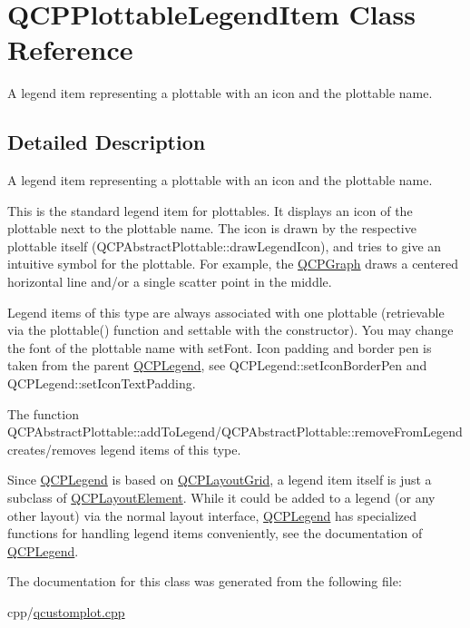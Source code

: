 \hypertarget{class_q_c_p_plottable_legend_item}{}\section{Q\+C\+P\+Plottable\+Legend\+Item Class Reference}
\label{class_q_c_p_plottable_legend_item}


A legend item representing a plottable with an icon and the plottable name.  




\subsection{Detailed Description}
A legend item representing a plottable with an icon and the plottable name. 

This is the standard legend item for plottables. It displays an icon of the plottable next to the plottable name. The icon is drawn by the respective plottable itself (Q\+C\+P\+Abstract\+Plottable\+::draw\+Legend\+Icon), and tries to give an intuitive symbol for the plottable. For example, the \mbox{\hyperlink{class_q_c_p_graph}{Q\+C\+P\+Graph}} draws a centered horizontal line and/or a single scatter point in the middle.

Legend items of this type are always associated with one plottable (retrievable via the plottable() function and settable with the constructor). You may change the font of the plottable name with set\+Font. Icon padding and border pen is taken from the parent \mbox{\hyperlink{class_q_c_p_legend}{Q\+C\+P\+Legend}}, see Q\+C\+P\+Legend\+::set\+Icon\+Border\+Pen and Q\+C\+P\+Legend\+::set\+Icon\+Text\+Padding.

The function Q\+C\+P\+Abstract\+Plottable\+::add\+To\+Legend/Q\+C\+P\+Abstract\+Plottable\+::remove\+From\+Legend creates/removes legend items of this type.

Since \mbox{\hyperlink{class_q_c_p_legend}{Q\+C\+P\+Legend}} is based on \mbox{\hyperlink{class_q_c_p_layout_grid}{Q\+C\+P\+Layout\+Grid}}, a legend item itself is just a subclass of \mbox{\hyperlink{class_q_c_p_layout_element}{Q\+C\+P\+Layout\+Element}}. While it could be added to a legend (or any other layout) via the normal layout interface, \mbox{\hyperlink{class_q_c_p_legend}{Q\+C\+P\+Legend}} has specialized functions for handling legend items conveniently, see the documentation of \mbox{\hyperlink{class_q_c_p_legend}{Q\+C\+P\+Legend}}. 

The documentation for this class was generated from the following file\+:\begin{DoxyCompactItemize}
\item 
cpp/\mbox{\hyperlink{qcustomplot_8cpp}{qcustomplot.\+cpp}}\end{DoxyCompactItemize}
